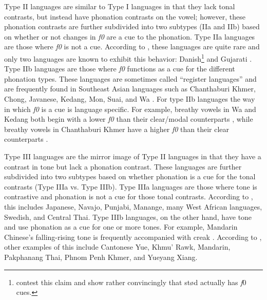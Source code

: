 Type II languages are similar to Type I languages in that they lack tonal contrasts, but instead have phonation contrasts on the vowel; however, these phonation contrasts are further subdivided into two subtypes (IIa and IIb) based on whether or not changes in \textit{f0} are a cue to the phonation. Type IIa languages are those where \textit{f0} is not a cue. According to \citet{espositoCrosslinguisticPatternsPhonation2020}, these languages are quite rare and only two languages are known to exhibit this behavior: Danish\footnote{\citet{frazierPhoneticsYucatecMaya2013,penaStodTimingDomain2022,penaProductionPerceptionStod2024} contest this claim and show rather convincingly that stød actually has \textit{f}0 cues.} \citep{gronnumDanishStodLaryngealization2013} and Gujarati \citep{khanPhoneticsContrastivePhonation2012}. Type IIb languages are those where \textit{f0} functions as a cue for the different phonation types. These languages are sometimes called ``register languages'' and are frequently found in Southeast Asian languages such as Chanthaburi Khmer, Chong, Javanese, Kedang, Mon, Suai, and Wa \citep[e.g.,][]{brunelleTonePhonationSoutheast2016,dicanioPhoneticsRegisterTakhian2009,samelyKedangEasternIndonesia1991,waylandAcousticCorrelatesBreathy2003}. For type IIb languages the way in which \textit{f0} is a cue is language specific. For example, breathy vowels in Wa and Kedang both begin with a lower \textit{f0} than their clear/modal counterparts \citep{samelyKedangEasternIndonesia1991}, while breathy vowels in Chanthaburi Khmer have a higher \textit{f0} than their clear counterparts \citep{waylandAcousticCorrelatesBreathy2003}. 

Type III languages are the mirror image of Type II languages in that they have a contrast in tone but lack a phonation contrast. These languages are further subdivided into two subtypes based on whether phonation is a cue for the tonal contrasts (Type IIIa vs. Type IIIb). Type IIIa languages are those where tone is contrastive and phonation is not a cue for those tonal contrasts. According to \citep{espositoCrosslinguisticPatternsPhonation2020}, this includes Japanese, Navajo, Punjabi, Manange, many West African languages, Swedish, and Central Thai. Type IIIb languages, on the other hand, have tone and use phonation as a cue for one or more tones. For example, Mandarin Chinese's falling-rising tone is frequently accompanied with creak \citep[e.g.,][]{kuangCovariationVoiceQuality2017}.  According to \citep{espositoCrosslinguisticPatternsPhonation2020}, other examples of this include Cantonese Yue, Khmu' Rawk, Mandarin, Pakphanang Thai, Phnom Penh Khmer, and Yueyang Xiang.

